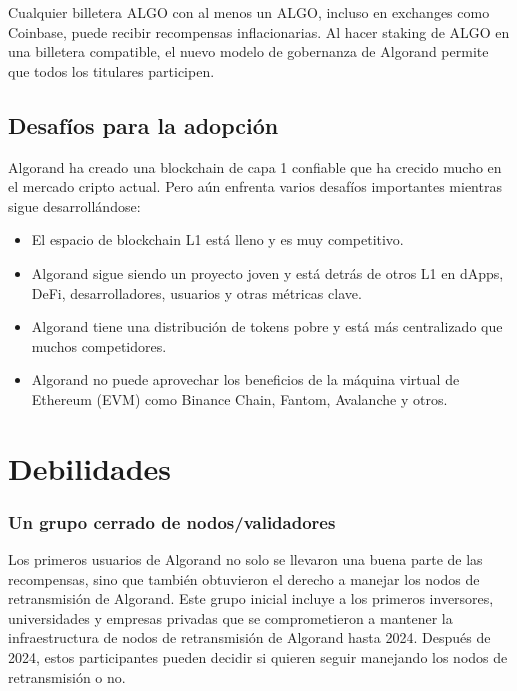 \documentclass{article}
\begin{document}
Cualquier billetera ALGO con al menos un ALGO, incluso en exchanges como Coinbase, puede recibir recompensas inflacionarias. Al hacer staking de ALGO en una billetera compatible, el nuevo modelo de gobernanza de Algorand permite que todos los titulares participen.

\subsection{Desafíos para la adopción}

Algorand ha creado una blockchain de capa 1 confiable que ha crecido mucho en el mercado cripto actual. Pero aún enfrenta varios desafíos importantes mientras sigue desarrollándose:

\begin{itemize}
    \item El espacio de blockchain L1 está lleno y es muy competitivo.
\end{itemize}
\begin{itemize}
    \item Algorand sigue siendo un proyecto joven y está detrás de otros L1 en dApps, DeFi, desarrolladores, usuarios y otras métricas clave.
\end{itemize}
\begin{itemize}
    \item Algorand tiene una distribución de tokens pobre y está más centralizado que muchos competidores.
\end{itemize}
\begin{itemize}
    \item Algorand no puede aprovechar los beneficios de la máquina virtual de Ethereum (EVM) como Binance Chain, Fantom, Avalanche y otros.
\end{itemize}

\section{Debilidades}

\subsubsection{Un grupo cerrado de nodos/validadores}


Los primeros usuarios de Algorand no solo se llevaron una buena parte de las recompensas, sino que también obtuvieron el derecho a manejar los nodos de retransmisión de Algorand. Este grupo inicial incluye a los primeros inversores, universidades y empresas privadas que se comprometieron a mantener la infraestructura de nodos de retransmisión de Algorand hasta 2024. Después de 2024, estos participantes pueden decidir si quieren seguir manejando los nodos de retransmisión o no.
\end{document}
